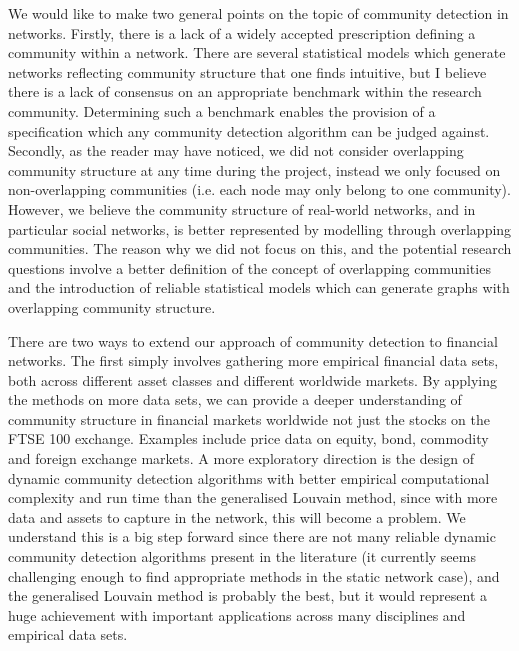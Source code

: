 We would like to make two general points on the topic of community detection in networks.
Firstly, there is a lack of a widely accepted prescription defining a community within a network.
There are several statistical models which generate networks reflecting community structure that one finds intuitive, but I believe there is a lack of consensus on an appropriate benchmark within the research community.
Determining such a benchmark enables the provision of a specification which any community detection algorithm can be judged against.
Secondly, as the reader may have noticed, we did not consider overlapping community structure at any time during the project, instead we only focused on non-overlapping communities (i.e. each node may only belong to one community).
However, we believe the community structure of real-world networks, and in particular social networks, is better represented by modelling through overlapping communities.
The reason why we did not focus on this, and the potential research questions involve a better definition of the concept of overlapping communities and the introduction of reliable statistical models which can generate graphs with overlapping community structure.

There are two ways to extend our approach of community detection to financial networks.
The first simply involves gathering more empirical financial data sets, both across different asset classes and different worldwide markets.
By applying the methods on more data sets, we can provide a deeper understanding of community structure in financial markets worldwide not just the stocks on the FTSE 100 exchange.
Examples include price data on equity, bond, commodity and foreign exchange markets.
A more exploratory direction is the design of dynamic community detection algorithms with better empirical computational complexity and run time than the generalised Louvain method, since with more data and assets to capture in the network, this will become a problem.
We understand this is a big step forward since there are not many reliable dynamic community detection algorithms present in the literature (it currently seems challenging enough to find appropriate methods in the static network case), and the generalised Louvain method is probably the best, but it would represent a huge achievement with important applications across many disciplines and empirical data sets.